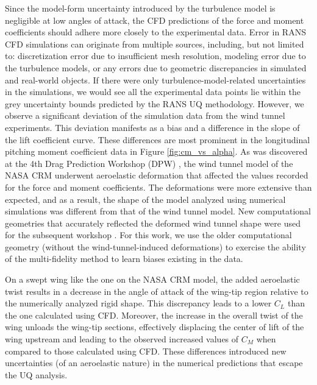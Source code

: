Since the model-form uncertainty introduced by the turbulence model is negligible at low angles of attack, the CFD predictions of the force and moment coefficients should adhere more closely to the experimental data.
Error in RANS CFD simulations can originate from multiple sources, including, but not limited to: discretization error due to insufficient mesh resolution, modeling error due to the turbulence models, or any errors due to geometric discrepancies in simulated and real-world objects.
If there were only turbulence-model-related uncertainties in the simulations, we would see all the experimental data points lie within the grey uncertainty bounds predicted by the RANS UQ methodology.
However,  we observe a significant deviation of the simulation data from the wind tunnel experiments.
This deviation manifests as a bias and a difference in the slope of the lift coefficient curve.
These differences are most prominent in the longitudinal pitching moment coefficient data in Figure \ref{fig:cm_vs_alpha}.
As was discovered at the 4th Drag Prediction Workshop (DPW) \cite{levy2013summary}, the wind tunnel model of the NASA CRM underwent aeroelastic deformation that affected the values recorded for the force and moment coefficients.
The deformations were more extensive than expected, and as a result, the shape of the model analyzed using numerical simulations was different from that of the wind tunnel model.
New computational geometries that accurately reflected the deformed wind tunnel shape were used for the subsequent workshop \cite{morrison20166th}.
For this work, we use the older computational geometry (without the wind-tunnel-induced deformations) to exercise the ability of the multi-fidelity method to learn biases existing in the data. 

On a swept wing like the one on the NASA CRM model, the added aeroelastic twist results in a decrease in the angle of attack of the wing-tip region relative to the numerically analyzed rigid shape.
This discrepancy leads to a lower $C_L$ than the one calculated using CFD.
Moreover, the increase in the overall twist of the wing unloads the wing-tip sections, effectively displacing the center of lift of the wing upstream and leading to the observed increased values of $C_M$ when compared to those calculated using CFD. 
These differences introduced new uncertainties (of an aeroelastic nature) in the numerical predictions that escape the UQ analysis.  

